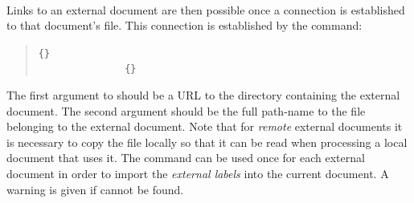 \paragraph*{\label{externlabels}}
\begin{changebar}
Links to an external document are then possible once a connection 
is established to that document's  file.  
This connection is established by the  command:%
\end{changebar}%
%
\begin{quote}
\begin{small}
\verb|{|\verb|}|\\
\verb|               {|\verb|}|
\end{small}
\end{quote}
%
\html{\\}%
The first argument to  should be a URL to 
the directory containing the external document.  
The second argument
should be the full path-name to the  file belonging
to the external document.  Note that for \emph{remote} external documents
it is necessary to copy the  file locally so that it
can be read when processing a local document that uses it.
The command  can be used once for each external
document in order to import the \textit{external labels}\label{externallabels}
into the current document.
A warning is given if  cannot be found.

